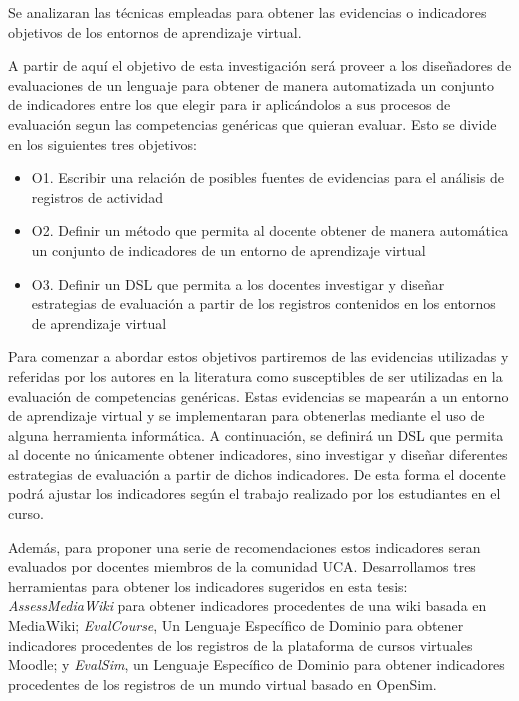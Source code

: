 

Se analizaran las técnicas empleadas para obtener las evidencias o indicadores objetivos de los entornos de aprendizaje virtual.


\bigskip
A partir de aquí el objetivo de esta investigación será proveer a los diseñadores de evaluaciones de un lenguaje para obtener de manera automatizada un conjunto de indicadores entre los que elegir para ir aplicándolos a sus procesos de evaluación segun las competencias genéricas que quieran evaluar. Esto se divide en los siguientes tres objetivos:
 
\begin{itemize}
\item O1. Escribir una relación de posibles fuentes de evidencias para el análisis de registros de actividad
\item O2. Definir un método que permita al docente obtener de manera automática un conjunto de indicadores de un entorno de aprendizaje virtual
\item O3. Definir un DSL que permita a los docentes investigar y diseñar estrategias de evaluación a partir de los registros contenidos en los entornos de aprendizaje virtual
\end{itemize}

Para comenzar a abordar estos objetivos partiremos de las evidencias utilizadas y referidas por los autores en la literatura como susceptibles de ser utilizadas en la evaluación de competencias genéricas. Estas evidencias se mapearán a un entorno de aprendizaje virtual y se implementaran para obtenerlas mediante el uso de alguna herramienta informática. A continuación, se definirá un DSL que permita al docente no únicamente obtener indicadores, sino investigar y diseñar diferentes estrategias de evaluación a partir de dichos indicadores. De esta forma el docente podrá ajustar los indicadores según el trabajo realizado por los estudiantes en el curso.



\bigskip
\bigskip

Además, para proponer una serie de recomendaciones estos indicadores seran evaluados por docentes miembros de la comunidad UCA. Desarrollamos tres herramientas para obtener los indicadores sugeridos en esta tesis: \emph{AssessMediaWiki} para obtener indicadores procedentes de una wiki basada en MediaWiki; \emph{EvalCourse}, Un Lenguaje Específico de Dominio para obtener indicadores procedentes de los registros de la plataforma de cursos virtuales Moodle; y \emph{EvalSim}, un Lenguaje Específico de Dominio para obtener indicadores procedentes de los registros de un mundo virtual basado en OpenSim.





